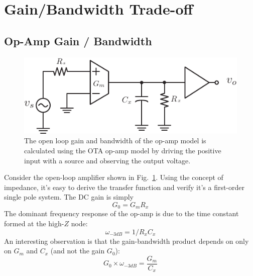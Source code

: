 \section{Gain/Bandwidth Trade-off}
\subsection{Op-Amp Gain / Bandwidth}
\begin{figure}[tb]
\begin{center}
\includegraphics[scale=1]{ota_amp_open}
\end{center}
\caption{The open loop gain and bandwidth of the op-amp model is calculated using the OTA op-amp model by driving the positive input with a source and observing the output voltage.}
\label{fig:ota_amp_open}
\end{figure}

Consider the open-loop amplifier shown in Fig.~\ref{fig:ota_amp_open}.  Using the concept of impedance, it's easy to derive the transfer function and verify it's a first-order single pole system.  The DC gain is simply
\begin{equation}
	G_0 = {G_m}{R_x}
\end{equation}
The dominant frequency response of the op-amp is due to the time constant formed at the high-$Z$ node:\begin{equation}
	\omega _{ - 3dB} = 1/{R_x}{C_x}
\end{equation}
An interesting observation is that the gain-bandwidth product depends on only on $G_m$ and $C_x$ (and not the gain $G_0$): 
\begin{equation}
	G_0 \times {\omega _{ - 3dB}} = \frac{{{G_m}}}{{{C_x}}}
\end{equation}
